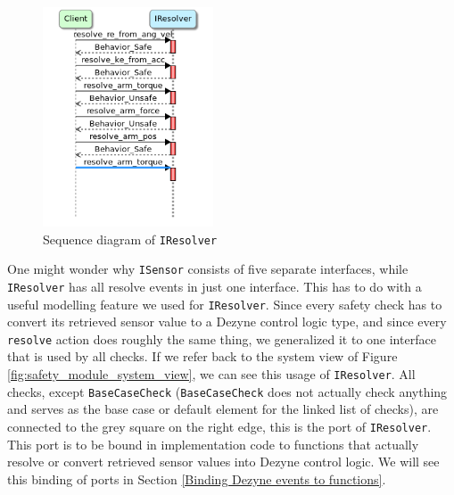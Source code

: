 \documentclass[12pt]{scrreprt}
\begin{document}
\begin{figure}[H]
    \centering
    \includegraphics[width=0.45\textwidth]{Figures/results/modelling_figures/IResolver/IResolver_seq.png}
    \caption{Sequence diagram of \texttt{IResolver}}
    \label{fig:IResolver_seq}
\end{figure}

One might wonder why \texttt{ISensor} consists of five separate interfaces, while \texttt{IResolver} has all resolve events in just one interface. This has to do with a useful modelling feature we used for \texttt{IResolver}. Since every safety check has to convert its retrieved sensor value to a Dezyne control logic type, and since every \texttt{resolve} action does roughly the same thing, we generalized it to one interface that is used by all checks. If we refer back to the system view of Figure \ref{fig:safety_module_system_view}, we can see this usage of \texttt{IResolver}. All checks, except \texttt{BaseCaseCheck} (\texttt{BaseCaseCheck} does not actually check anything and serves as the base case or default element for the linked list of checks), are connected to the grey square on the right edge, this is the port of \texttt{IResolver}. This port is to be bound in implementation code to functions that actually resolve or convert retrieved sensor values into Dezyne control logic. We will see this binding of ports in Section \ref{Binding Dezyne events to functions}.
\end{document}
